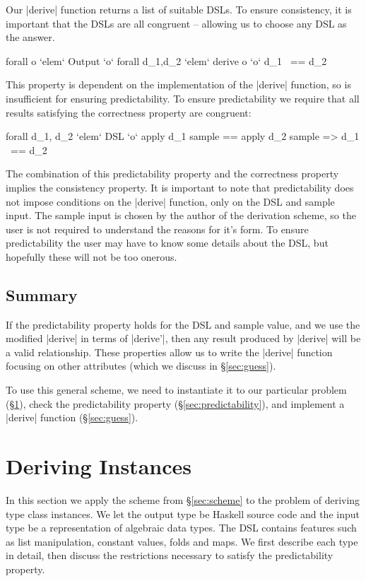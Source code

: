 \documentclass{llncs}
\begin{document}
Our |derive| function returns a list of suitable DSLs. To ensure consistency, it is important that the DSLs are all congruent -- allowing us to choose any DSL as the answer.

\ignore\begin{code}
forall o `elem` Output `o` forall d_1,d_2 `elem` derive o `o` d_1 ~== d_2
\end{code}

This property is dependent on the implementation of the |derive| function, so is insufficient for ensuring predictability. To ensure predictability we require that all results satisfying the correctness property are congruent:

\ignore\begin{code}
forall d_1, d_2 `elem` DSL `o`
    apply d_1 sample == apply d_2 sample => d_1 ~== d_2
\end{code}

The combination of this predictability property and the correctness property implies the consistency property. It is important to note that predictability does not impose conditions on the |derive| function, only on the DSL and sample input. The sample input is chosen by the author of the derivation scheme, so the user is not required to understand the reasons for it's form. To ensure predictability the user may have to know some details about the DSL, but hopefully these will not be too onerous.

\subsection{Summary}

If the predictability property holds for the DSL and sample value, and we use the modified |derive| in terms of |derive'|, then any result produced by |derive| will be a valid relationship. These properties allow us to write the |derive| function focusing on other attributes (which we discuss in \S\ref{sec:guess}).

To use this general scheme, we need to instantiate it to our particular problem (\S\ref{sec:instances}), check the predictability property (\S\ref{sec:predictability}), and implement a |derive| function (\S\ref{sec:guess}).

\section{Deriving Instances}
\label{sec:instances}

In this section we apply the scheme from \S\ref{sec:scheme} to the problem of deriving type class instances. We let the output type be Haskell source code and the input type be a representation of algebraic data types. The DSL contains features such as list manipulation, constant values, folds and maps. We first describe each type in detail, then discuss the restrictions necessary to satisfy the predictability property.
\end{document}
